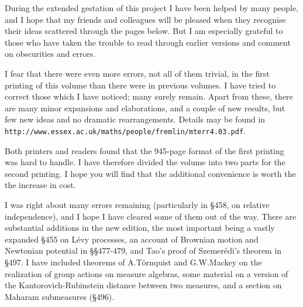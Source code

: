 During the extended gestation of this project I have been helped by many
people, and I hope that my friends and colleagues will be pleased when
they recognise their ideas scattered through the pages below.   But I am
especially grateful to those who have taken the trouble to read through
earlier versions and comment on obscurities and errors.
     
     
     
\medskip
     

     
\bigskip


\medskip

I fear that there were even more errors, not all of them trivial,
in the first printing of this
volume than there were in previous volumes.   I have tried to correct
those which I have noticed;  many surely remain.   Apart from these, there
are many minor expansions and elaborations, and a couple of new results,
but few new ideas and no dramatic rearrangements.
Details may be found in 
{\tt http://www.essex.ac.uk/maths/people/fremlin/mterr4.03.pdf}.

Both printers and readers found that the 945-page format of the first
printing was hard to handle.   I have therefore divided the volume into two
parts for the second printing.   I hope you will find that the additional
convenience is worth the the increase in cost.

\bigskip


\medskip

I was right about many errors remaining (particularly in \S458, on relative
independence), and I hope I have cleared some of
them out of the way.   There are substantial additions in the new edition,
the most important being a vastly expanded \S455 on L\'evy processes, an
account of Brownian motion and Newtonian potential in \S\S477-479, and
Tao's proof of Szemer\'edi's theorem in \S497.   I have included 
theorems of A.T\"ornquist and G.W.Mackey on the realization of group
actions on measure algebras, some material on a version of the
Kantorovich-Rubinstein distance between two measures, and a section on
Maharam submeasures (\S496).

